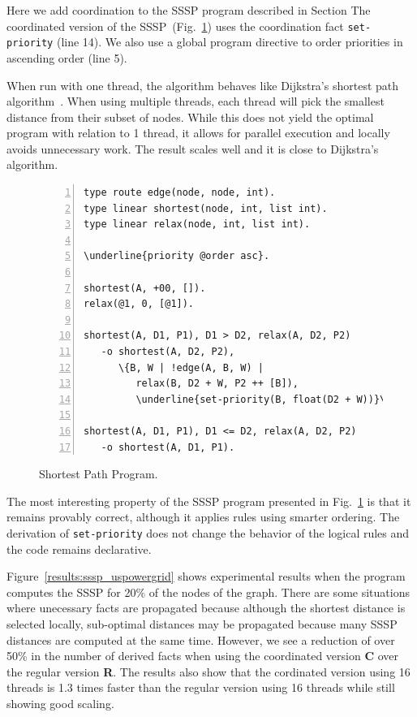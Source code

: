 Here we add coordination to the SSSP program described in Section
The coordinated version of the
SSSP~(Fig.~\ref{code:shortest_path_program_coord}) uses the coordination fact
\texttt{set-priority} (line 14). We also use a global program directive to order
priorities in ascending order (line 5).

When run with one thread, the algorithm behaves like
Dijkstra's shortest path algorithm~\cite{Dijkstra}. When using multiple
threads, each thread will pick the smallest distance from their subset of nodes.
While this does not yield the optimal program with relation to 1 thread, it
allows for parallel execution and locally avoids unnecessary work. The result
scales well and it is close to Dijkstra's algorithm.

\begin{figure}[h!]
\scriptsize\begin{Verbatim}[numbers=left,commandchars=\\\{\}]
type route edge(node, node, int).
type linear shortest(node, int, list int).
type linear relax(node, int, list int).

\underline{priority @order asc}.

shortest(A, +00, []).
relax(@1, 0, [@1]).

shortest(A, D1, P1), D1 > D2, relax(A, D2, P2)
   -o shortest(A, D2, P2),
      \{B, W | !edge(A, B, W) |
         relax(B, D2 + W, P2 ++ [B]),
         \underline{set-priority(B, float(D2 + W))}\}.

shortest(A, D1, P1), D1 <= D2, relax(A, D2, P2)
   -o shortest(A, D1, P1).
\end{Verbatim}
  \caption{Shortest Path Program.}
  \label{code:shortest_path_program_coord}
\end{figure}
\normalsize

The most interesting property of the SSSP program presented in
Fig.~\ref{code:shortest_path_program_coord} is that it remains provably correct,
although it applies rules using smarter ordering. The derivation of
\texttt{set-priority} does not change the behavior of the logical rules and the
code remains declarative.

Figure~\ref{results:sssp_uspowergrid} shows experimental results when the
program computes the SSSP for 20\% of the nodes of the graph.
There are some situations where unecessary facts are propagated
because although the shortest distance is selected locally, sub-optimal distances may be
propagated because many SSSP distances are computed at the same time.
However, we see a reduction of over 50\% in the number of
derived facts when using the coordinated version \textbf{C} over the regular
version \textbf{R}. The results also show that the cordinated
version using 16 threads is 1.3 times faster than the regular version using 16
threads while still showing good scaling.

